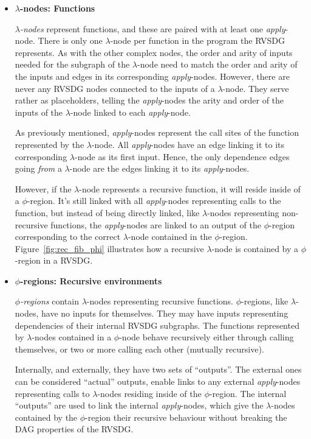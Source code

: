 \begin{itemize}
\clearpage
\item \textbf{$\lambda$-nodes: Functions}

\textit{$\lambda$-nodes} represent functions, and these are paired with at least
one \textit{apply}-node. There is only one $\lambda$-node per function in the
program the RVSDG represents. As with the other complex nodes, the order and
arity of inputs needed for the subgraph of the $\lambda$-node need to match the
order and arity of the inputs and edges in its corresponding
\textit{apply}-nodes. However, there are never any RVSDG nodes connected to the
inputs of a $\lambda$-node. They serve rather as placeholders, telling the
\textit{apply}-nodes the arity and order of the inputs of the $\lambda$-node
linked to each \textit{apply}-node.

As previously mentioned, \textit{apply}-nodes represent the call sites of the
function represented by the $\lambda$-node. All \textit{apply}-nodes have an
edge linking it to its corresponding $\lambda$-node as its first input. Hence,
the only dependence edges going \textit{from} a $\lambda$-node are the edges
linking it to its \textit{apply}-nodes.

However, if the $\lambda$-node represents a recursive function, it will reside
inside of a $\phi$-region. It's still linked with all \textit{apply}-nodes
representing calls to the function, but instead of being directly linked, like
$\lambda$-nodes representing non-recursive functions, the \textit{apply}-nodes
are linked to an output of the $\phi$-region corresponding to the correct
$\lambda$-node contained in the $\phi$-region. Figure~\ref{fig:rec_fib_phi}
illustrates how a recursive $\lambda$-node is contained by a $\phi$-region in a
RVSDG.

\item \textbf{$\phi$-regions: Recursive environments}

\textit{$\phi$-regions} contain $\lambda$-nodes representing recursive
functions. $\phi$-regions, like $\lambda$-nodes, have no inputs for themselves.
They may have inputs representing dependencies of their internal RVSDG
subgraphs. The functions represented by $\lambda$-nodes contained in a
$\phi$-node behave recursively either through calling themselves, or two or more
calling each other (mutually recursive).

Internally, and externally, they have two sets of ``outputs''. The external ones
can be considered ``actual'' outputs, enable links to any external
\textit{apply}-nodes representing calls to $\lambda$-nodes residing inside of
the $\phi$-region. The internal ``outputs'' are used to link the internal
\textit{apply}-nodes, which give the $\lambda$-nodes contained by the
$\phi$-region their recursive behaviour without breaking the DAG properties of
the RVSDG.


\end{itemize}
